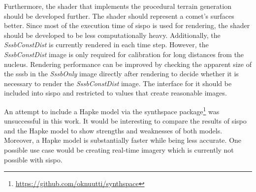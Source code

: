 Furthermore, the shader that implements the procedural terrain generation should be developed further. The shader should represent a comet's surfaces better. Since most of the execution time of \gls{sispo} is used for rendering, the shader should be developed to be less computationally heavy. Additionally, the \textit{SssbConstDist} is currently rendered in each time step. However, the \textit{SssbConstDist} image is only required for calibration for long distances from the nucleus. Rendering performance can be improved by checking the apparent size of the \gls{sssb} in the \textit{SssbOnly} image directly after rendering to decide whether it is necessary to render the \textit{SssbConstDist} image.  The interface for it should be included into \gls{sispo} and restricted to values that create reasonable images.

An attempt to include a Hapke model via the synthspace package\footnote{\url{https://github.com/oknuutti/synthspace}} was unsuccessful in this work. It would be interesting to compare the results of \gls{sispo} and the Hapke model to show strengths and weaknesses of both models. Moreover, a Hapke model is substantially faster while being less accurate. One possible use case would be creating real-time imagery which is currently not possible with \gls{sispo}.